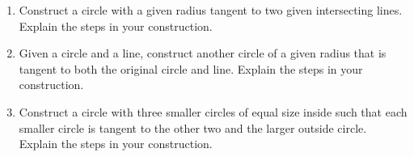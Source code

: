 \begin{enumerate}
\item Construct a circle with a given radius tangent to two given
  intersecting lines. Explain the steps in your construction.

\item Given a circle and a line, construct another circle of a given
  radius that is tangent to both the original circle and line. Explain
  the steps in your construction.

\item Construct a circle with three smaller circles of equal size
  inside such that each smaller circle is tangent to the other two and
  the larger outside circle. Explain the steps in your construction.

\end{enumerate}
